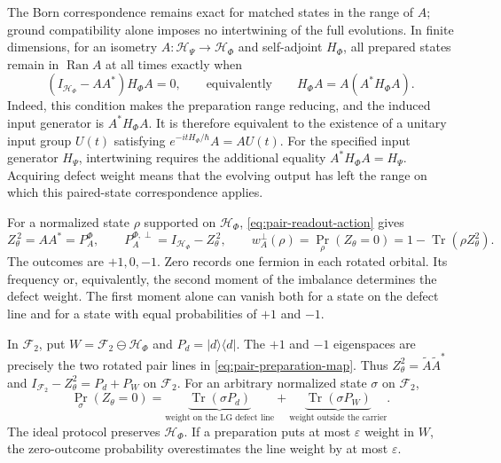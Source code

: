 \documentclass[11pt,reqno]{scrartcl}
\newcommand{\scrHP}{\mathscr H_{\Psi}}
\newcommand{\scrHF}{\mathscr H_{\Phi}}
\newcommand{\ket}[1]{\lvert #1\rangle}
\newcommand{\bra}[1]{\langle #1\rvert}
\newcommand{\proj}[1]{\ket{#1}\!\bra{#1}}
\DeclareMathOperator{\Ran}{Ran}
\newcommand{\suppProjF}{P_{A}^{\Phi}}
\newcommand{\defectProjF}{P_{A}^{\Phi,\perp}}
\DeclareMathOperator{\Tr}{Tr}
\newcommand{\defectWeight}{w_{A}^{\perp}}
\theoremstyle{plain}
\theoremstyle{definition}
\theoremstyle{remark}
\begin{document}
The Born correspondence remains exact for matched states in the
range of $A$; ground compatibility alone imposes no intertwining
of the full evolutions.  In finite dimensions, for an isometry
$A:\scrHP\to\scrHF$ and self-adjoint $H_\Phi$, all prepared states
remain in $\Ran A$ at all times exactly when
\begin{equation}
 (I_{\scrHF}-AA^*)H_\Phi A=0,
 \qquad\text{equivalently}\qquad
 H_\Phi A=A(A^*H_\Phi A).
 \label{eq:finite-preparation-invariance}
\end{equation}
Indeed, this condition makes the preparation range reducing,
and the induced input generator is $A^*H_\Phi A$.
It is therefore equivalent to the existence of a unitary input
group $U(t)$ satisfying
$e^{-itH_\Phi/\hbar}A=AU(t)$.
For the specified input generator $H_\Psi$, intertwining requires
the additional equality $A^*H_\Phi A=H_\Psi$.
Acquiring defect weight means that the evolving output has left
the range on which this paired-state correspondence applies.

For a normalized state $\rho$ supported on $\scrHF$,
\eqref{eq:pair-readout-action} gives
\begin{equation}
  Z_{\theta}^{\,2}=AA^*=\suppProjF,\qquad
  \defectProjF=I_{\scrHF}-Z_{\theta}^{\,2},\qquad
  \defectWeight(\rho)=\Pr_{\rho}(Z_{\theta}=0)
                     =1-\Tr(\rho Z_\theta^2).
  \label{eq:pair-defect-measurement}
\end{equation}
The outcomes are $+1,0,-1$.  Zero records one fermion in each rotated
orbital.  Its frequency or, equivalently, the second moment of the
imbalance determines the defect weight.  The first moment alone can
vanish both for a state on the defect line and for a state with equal
probabilities of $+1$ and $-1$.

In $\mathcal F_2$, put $W=\mathcal F_2\ominus\scrHF$ and
$P_d=\proj{d}$.  The $+1$ and $-1$ eigenspaces are precisely the two
rotated pair lines in \eqref{eq:pair-preparation-map}.  Thus
$Z_\theta^2=\widetilde A\widetilde A^*$ and
$I_{\mathcal F_2}-Z_\theta^2=P_d+P_W$ on $\mathcal F_2$.  For an arbitrary
normalized state $\sigma$ on $\mathcal F_2$,
\begin{equation}
  \Pr_\sigma(Z_\theta=0)
  =\underbrace{\Tr(\sigma P_d)}_{\text{weight on the LG defect line}}
   +\underbrace{\Tr(\sigma P_W)}_{\text{weight outside the carrier}} .
  \label{eq:pair-ambient-zero}
\end{equation}
The ideal protocol preserves $\scrHF$.  If a preparation puts at most
$\varepsilon$ weight in $W$, the zero-outcome probability overestimates
the line weight by at most $\varepsilon$.
\end{document}
